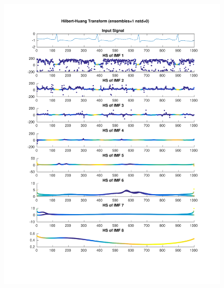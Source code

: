 \documentclass{beamer}
\begin{document}
\begin{frame}
\begin{columns}
\begin{figure}
\includegraphics[width=\textwidth]{fig/112l1_hht.pdf}
\end{figure}
\end{columns}
\end{frame}
\end{document}
